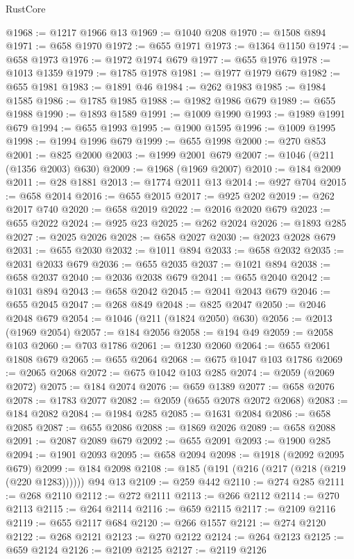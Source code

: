 \begin{lexlean}{RustCore}
\begin{coremodule}
@1968 := @1217 @1966 @13
@1969 := @1040 @208
@1970 := @1508 @894
@1971 := @658 @1970
@1972 := @655 @1971
@1973 := @1364 @1150
@1974 := @658 @1973
@1976 := @1972 @1974 @679
@1977 := @655 @1976
@1978 := @1013 @1359
@1979 := @1785 @1978
@1981 := @1977 @1979 @679
@1982 := @655 @1981
@1983 := @1891 @46
@1984 := @262 @1983
@1985 := @1984 @1585
@1986 := @1785 @1985
@1988 := @1982 @1986 @679
@1989 := @655 @1988
@1990 := @1893 @1589
@1991 := @1009 @1990
@1993 := @1989 @1991 @679
@1994 := @655 @1993
@1995 := @1900 @1595
@1996 := @1009 @1995
@1998 := @1994 @1996 @679
@1999 := @655 @1998
@2000 := @270 @853
@2001 := @825 @2000
@2003 := @1999 @2001 @679
@2007 := @1046 (@211 (@1356 @2003) @630)
@2009 := @1968 (@1969 @2007)
@2010 := @184 @2009
@2011 := @28 @1881
@2013 := @1774 @2011 @13
@2014 := @927 @704
@2015 := @658 @2014
@2016 := @655 @2015
@2017 := @925 @202
@2019 := @262 @2017 @740
@2020 := @658 @2019
@2022 := @2016 @2020 @679
@2023 := @655 @2022
@2024 := @925 @23
@2025 := @262 @2024
@2026 := @1893 @285
@2027 := @2025 @2026
@2028 := @658 @2027
@2030 := @2023 @2028 @679
@2031 := @655 @2030
@2032 := @1011 @894
@2033 := @658 @2032
@2035 := @2031 @2033 @679
@2036 := @655 @2035
@2037 := @1021 @894
@2038 := @658 @2037
@2040 := @2036 @2038 @679
@2041 := @655 @2040
@2042 := @1031 @894
@2043 := @658 @2042
@2045 := @2041 @2043 @679
@2046 := @655 @2045
@2047 := @268 @849
@2048 := @825 @2047
@2050 := @2046 @2048 @679
@2054 := @1046 (@211 (@1824 @2050) @630)
@2056 := @2013 (@1969 @2054)
@2057 := @184 @2056
@2058 := @194 @49
@2059 := @2058 @103
@2060 := @703 @1786
@2061 := @1230 @2060
@2064 := @655 @2061 @1808 @679
@2065 := @655 @2064
@2068 := @675 @1047 @103 @1786
@2069 := @2065 @2068
@2072 := @675 @1042 @103 @285
@2074 := @2059 (@2069 @2072)
@2075 := @184 @2074
@2076 := @659 @1389
@2077 := @658 @2076
@2078 := @1783 @2077
@2082 := @2059 (@655 @2078 @2072 @2068)
@2083 := @184 @2082
@2084 := @1984 @285
@2085 := @1631 @2084
@2086 := @658 @2085
@2087 := @655 @2086
@2088 := @1869 @2026
@2089 := @658 @2088
@2091 := @2087 @2089 @679
@2092 := @655 @2091
@2093 := @1900 @285
@2094 := @1901 @2093
@2095 := @658 @2094
@2098 := @1918 (@2092 @2095 @679)
@2099 := @184 @2098
@2108 := @185 (@191 (@216 (@217 (@218 (@219 (@220 @1283)))))) @94 @13
@2109 := @259 @442
@2110 := @274 @285
@2111 := @268 @2110
@2112 := @272 @2111
@2113 := @266 @2112
@2114 := @270 @2113
@2115 := @264 @2114
@2116 := @659 @2115
@2117 := @2109 @2116
@2119 := @655 @2117 @684
@2120 := @266 @1557
@2121 := @274 @2120
@2122 := @268 @2121
@2123 := @270 @2122
@2124 := @264 @2123
@2125 := @659 @2124
@2126 := @2109 @2125
@2127 := @2119 @2126

\end{coremodule}
\end{lexlean}
